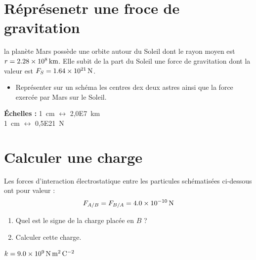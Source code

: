 \documentclass[a4paper,11pt,fleqn]{article}%
\begin{document}
	\maketitle
\section{Réprésenetr une froce de gravitation}
la planète Mars possède une orbite autour du Soleil dont le rayon moyen est $r = \SI{2,28E8}{km}$. Elle subit de la part du Soleil une force de gravitation dont la valeur est $F_S = \SI{1,64E21}{N}$.
\begin{itemize}
    \item Représenter sur un schéma les centres dex deux astres ainsi que la force exercée par Mars sur le Soleil.
\end{itemize}
\textbf{Échelles :} \SI{1}{cm} $\leftrightarrow$ \SI{2,0E7}{km}\\
\SI{1}{cm} $\leftrightarrow$ \SI{0,5E21}{N}

\section{Calculer une charge}
Les forces d'interaction électrostatique entre les particules schématisées ci-dessous ont pour valeur : $$ F_{A/B} = F_{B/A} = \SI{4,0E-10}{N}$$
\begin{center}
\end{center}
\begin{enumerate}
    \item Quel est le signe de la charge placée en $B$ ?
    \item Calculer cette charge.
\end{enumerate}
\begin{data}
$k = \SI{9,0E9}{\newton\meter\squared\per\coulomb\squared}$
\end{data}
\end{document}
